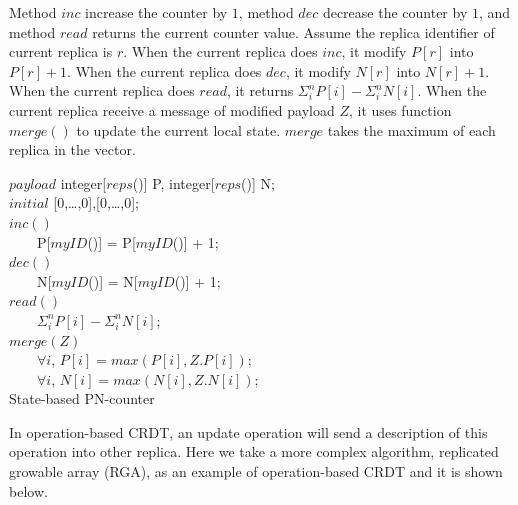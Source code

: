 Method $\mathit{inc}$ increase the counter by $1$, method $\mathit{dec}$ decrease the counter by $1$, and method $\mathit{read}$ returns the current counter value. Assume the replica identifier of current replica is $r$. When the current replica does $\mathit{inc}$, it modify $P[r]$ into $P[r]+1$. When the current replica does $\mathit{dec}$, it modify $N[r]$ into $N[r]+1$. When the current replica does $\mathit{read}$, it returns $\Sigma_{i}^{n} P[i] - \Sigma_{i}^{n} N[i]$. When the current replica receive a message of modified payload $Z$, it uses function $\mathit{merge}()$ to update the current local state. $\mathit{merge}$ takes the maximum of each replica in the vector.

\renewcommand{\algorithmcfname}{CRDT Implementation}
\noindent
\noindent\begin{algorithm}[H]
$\mathit{payload}$ integer[$\mathit{reps}$()] P, integer[$\mathit{reps}$()] N; \\
$\mathit{initial}$ [0,\ldots,0],[0,\ldots,0]; \\

$\mathit{inc}()$ \\
\ \ \ \ P[$\mathit{myID}$()] = P[$\mathit{myID}$()] + 1; \\

$\mathit{dec}()$ \\
\ \ \ \ N[$\mathit{myID}$()] = N[$\mathit{myID}$()] + 1; \\

$\mathit{read}()$ \\
\ \ \ \ \KwRet $\Sigma_{i}^{n} P[i] - \Sigma_{i}^{n} N[i]$; \\

$\mathit{merge}(Z)$ \\
\ \ \ \ $\forall i$, $P[i] = \mathit{max}(P[i],Z.P[i])$; \\
\ \ \ \ $\forall i$, $N[i] = \mathit{max}(N[i],Z.N[i])$; \\
\caption{State-based PN-counter}
\label{Method1}
\end{algorithm}

In operation-based CRDT, an update operation will send a description of this operation into other replica. Here we take a more complex algorithm, replicated growable array (RGA), as an example of operation-based CRDT and it is shown below.

